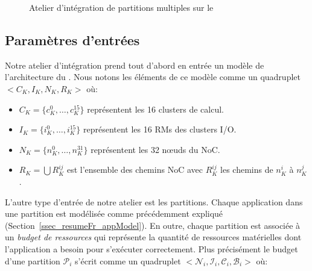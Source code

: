 \documentclass[main.tex]{subfiles}
\begin{document}
\begin{figure}
    \centering
    \scalebox{0.9}{}
    \caption{Atelier d'intégration de partitions multiples sur le \mppalong}
    \label{fig_resumeFr_workFlow}
\end{figure}



\subsection{Paramètres d'entrées}
\label{ssec_resumeFr_paramEntreeWorkflow}
Notre atelier d'intégration prend tout d'abord en entrée un modèle de l'architecture du \mppalong. Nous notons les éléments de ce modèle comme un quadruplet $< C_K , I_K , N_K, R_K >$ où:
\begin{itemize}
    \item $C_K = \{ c_K^0 , \ldots , c_K^{15} \}$ représentent les 16 clusters de calcul.
    \item $I_K = \{ i_K^0 , \ldots , i_K^{15} \}$ représentent les 16 RMs des clusters I/O.
    \item $N_K = \{ n_K^0 , \ldots , n_K^{31} \}$ représentent les 32 n\oe{}uds du NoC.
    \item $R_K = \bigcup R_K^{ij}$ est l'ensemble des chemins NoC avec $R_K^{ij}$ les chemins de $n_K^i$ à $n_K^j$.
\end{itemize}

L'autre type d'entrée de notre atelier est les partitions. Chaque application dans une partition est modélisée comme précédemment expliqué (Section~\ref{ssec_resumeFr_appModel}). En outre, chaque partition est associée à un \emph{budget de ressources} qui représente la quantité de ressources matérielles dont l'application a besoin pour s'exécuter correctement. Plus précisément le budget d'une partition $\mathcal{P}_i$ s'écrit comme un quadruplet $<\mathcal{N}_i , \mathcal{I}_i , \mathcal{C}_i , \mathcal{B}_i>$ où:
\end{document}
